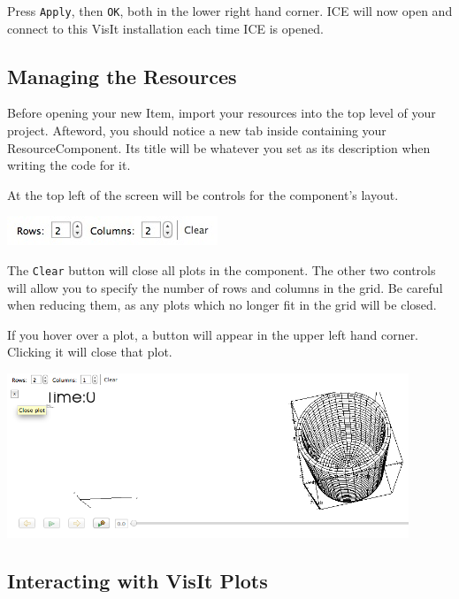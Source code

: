 \documentclass{article}
\begin{document}
Press \texttt{Apply}, then \texttt{OK}, both in the lower right hand corner. ICE
will now open and connect to this VisIt installation each time ICE is opened.

\subsection{Managing the Resources}

Before opening your new Item, import your resources into the top level of your 
project. Afteword, you should notice a new tab inside containing your 
ResourceComponent. Its title will be whatever you set as its description when 
writing the code for it.

At the top left of the screen will be controls for the component's layout.

\begin{center}
\includegraphics{images/ResourceComponentControls}
\end{center}

The \texttt{Clear} button will close all plots in the component. The other two
controls will allow you to specify the number of rows and columns in the grid.
Be careful when reducing them, as any plots which no longer fit in the grid will
be closed.

If you hover over a plot, a button will appear in the upper left hand corner.
Clicking it will close that plot. 

\begin{center}
\includegraphics[width=12cm]{images/ClosePlotButton}
\end{center}

\subsection{Interacting with VisIt Plots}
\end{document}
